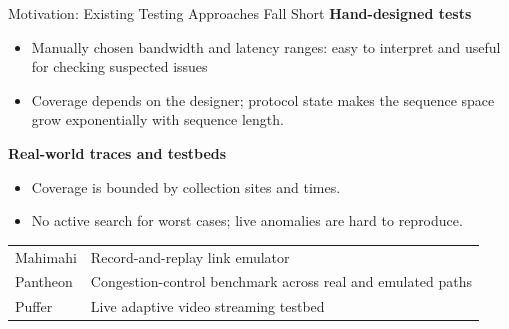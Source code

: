 \source{}
\begin{frame}[t]{Motivation: Existing Testing Approaches Fall Short}
\bodyfont
{\color{SemBlue}\textbf{Hand-designed tests}}\par
\begin{itemize}\setlength{\itemsep}{7pt}
\item Manually chosen bandwidth and latency ranges: easy to interpret\newline
      and useful for checking suspected issues
\item Coverage depends on the designer; protocol state makes the\newline
      sequence space grow exponentially with sequence length.
\end{itemize}
\pause
\vspace{16pt}
{\color{SemBlue}\textbf{Real-world traces and testbeds}}\par
\begin{itemize}\setlength{\itemsep}{7pt}
\item Coverage is bounded by collection sites and times.
\item No active search for worst cases; live anomalies are hard to reproduce.
\end{itemize}
\vspace{12pt}
{\renewcommand{\arraystretch}{1.2}
\begin{tabularx}{\linewidth}{@{}p{140pt} L@{}}
\toprule
Mahimahi & Record-and-replay link emulator\\
Pantheon & Congestion-control benchmark across real and emulated paths\\
Puffer & Live adaptive video streaming testbed\\
\bottomrule
\end{tabularx}}
\end{frame}

